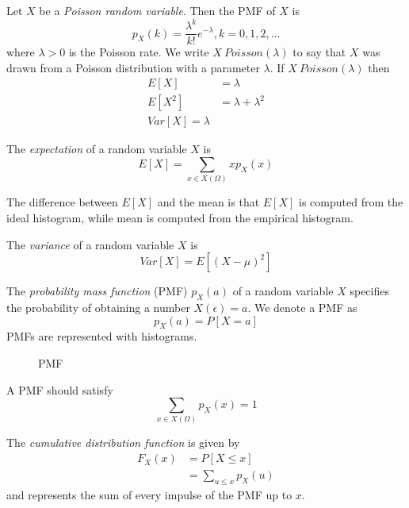 Let $X$ be a \emph{Poisson random variable}. Then the PMF
of $X$ is
\begin{equation}
    p_X(k) = \frac{\lambda^k}{k!}e^{-\lambda}, k=0, 1, 2,\dots
\end{equation}
where $\lambda > 0$ is the Poisson rate. We write
$X ~ Poisson(\lambda)$ to say that $X$ was drawn from
a Poisson distribution with a parameter $\lambda$.
If $X ~ Poisson(\lambda)$ then
\begin{align}
    E[X]   & = \lambda             \\
    E[X^2] & = \lambda + \lambda^2 \\
    Var[X] = \lambda
\end{align}

The \emph{expectation} of a random variable $X$ is
\begin{equation}
    E[X] = \sum_{x\in X(\Omega)} xp_X(x)
\end{equation}

The difference between $E[X]$ and the mean is
that $E[X]$ is computed from the ideal histogram,
while mean is computed from the empirical histogram.

The \emph{variance} of a random variable $X$ is
\begin{equation}
    Var[X] = E\left[(X-\mu)^2\right]
\end{equation}

The \emph{probability mass function} (PMF) $p_X(a)$
of a random variable $X$ specifies the probability of
obtaining a number $X(\epsilon) = a$. We denote a PMF as
\begin{equation}
    p_X(a) = P[X = a]
\end{equation}
PMFs are represented with histograms.
\begin{figure}[h]
    \centering
    \caption{PMF}
\end{figure}
A PMF should satisfy
\begin{equation}
    \sum_{x\in X(\Omega)} p_X(x) = 1
\end{equation}

The \emph{cumulative distribution function} is given by
\begin{align}
    F_X(x) & = P\left[X \leq x\right] \\
           & = \sum_{u \leq x} p_X(u)
\end{align}
and represents the sum of every impulse
of the PMF up to $x$.